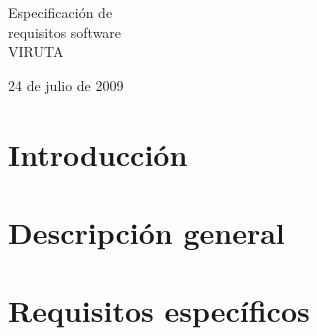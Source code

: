 \documentclass[11pt,a4paper]{article}
\begin{document}
\begin{titlepage}
\vspace*{8cm}
\begin{center}
{\Huge \textsf{Especificación de \\ requisitos software \\ VIRUTA}}\\

\vspace*{2cm}

\textsf{\Large 24 de julio de 2009}
\end{center}
\end{titlepage}

\tableofcontents
\thispagestyle{empty}
\newpage


\section{Introducción}



\section{Descripción general}



\section{Requisitos específicos}


\end{document}
